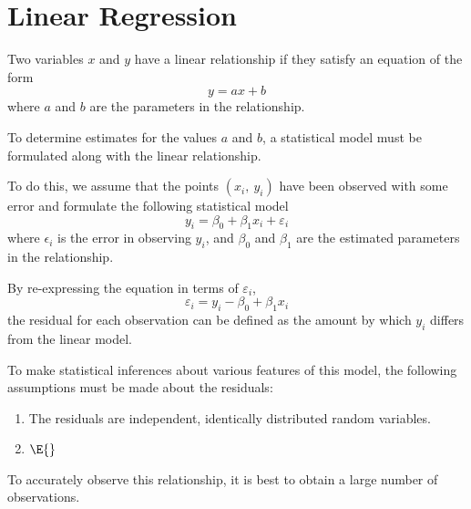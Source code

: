 \documentclass{article}
\begin{document}
\section{Linear Regression}
\begin{definition}
    Two variables $x$ and $y$ have a linear relationship if they satisfy an equation of the form
    \begin{equation*}
        y = a x + b
    \end{equation*}
    where $a$ and $b$ are the parameters in the relationship. 
\end{definition}
To determine estimates for the values $a$ and $b$, a statistical model must be formulated along with the linear relationship.

To do this, we assume that the points $\left( x_i,\: y_i \right)$ have been observed with some error and formulate the following statistical model
\begin{equation*}
    y_i = \beta_0 + \beta_1 x_i + \varepsilon_i
\end{equation*}
where $\epsilon_i$ is the error in observing $y_i$, and $\beta_0$ and $\beta_1$ are the estimated parameters in the relationship.
\begin{definition}[Residual]
    By re-expressing the equation in terms of $\varepsilon_i$,
    \begin{equation*}
        \varepsilon_i = y_i - \beta_0 + \beta_1 x_i
    \end{equation*}
    the residual for each observation can be defined as the amount by which $y_i$ differs from the linear model.
\end{definition}
To make statistical inferences about various features of this model, the following assumptions must be made about the residuals:
\begin{enumerate}
    \item The residuals are independent, identically distributed random variables.
    \item $\E{}$
\end{enumerate} 

To accurately observe this relationship, it is best to obtain a large number of observations.
\end{document}

